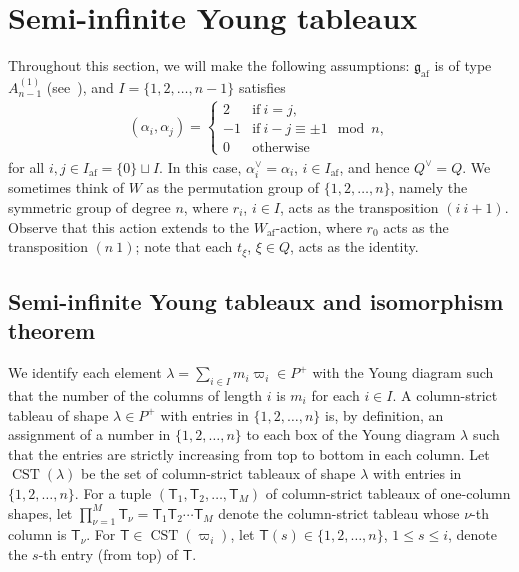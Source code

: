 \documentclass[ALCO,ThmDefs,Unicode,epreuves]{cedram}
\newcommand{\Fg}{\mathfrak{g}}
\DeclareMathOperator{\af}{af}
\DeclareMathOperator{\CST}{CST}
\begin{document}
\section{Semi-infinite Young tableaux} \label{Section:SiYT}

Throughout this section, 
we will make the following assumptions: 
$\Fg_{\af}$ 
is of type 
$A_{n-1}^{(1)}$
(see~\cite[\S~4.8 TABLE Aff1]{Kac}), 
and 
$I = \{ 1, 2, \ldots ,n-1 \}$ 
satisfies 
\begin{align}
(\alpha_i , \alpha_j)
=
\begin{cases}
2 & \text{if} \ i=j, \\
-1 & \text{if} \ i-j \equiv \pm 1 \mod n, \\
0 & \text{otherwise}
\end{cases}
\end{align}
for all $i , j \in I_{\af} = \{ 0 \} \sqcup I$. 
In this case, 
$\alpha_i^{\vee} = \alpha_i$, $i \in I_{\af}$, 
and hence 
$Q^{\vee} = Q$.
We sometimes think of $W$ as the permutation group of 
$\{ 1, 2, \ldots ,n \}$, namely the symmetric group of degree $n$, 
where $r_i$, $i \in I$, acts as the transposition $(i \ i+1)$. 
Observe that this action extends to the $W_{\af}$-action, 
where 
$r_0$ 
acts as the transposition $(n \ 1)$; 
note that each 
$t_{\xi}$, $\xi \in Q$, 
acts as the identity. 

\subsection{Semi-infinite Young tableaux and isomorphism theorem} \label{subsection:SiYT}

We identify each element $\lambda = \sum_{i \in I} m_i \varpi_i \in P^+$ 
with the Young diagram such that the number of the columns of length $i$ is $m_i$ for each $i \in I$. 
A column-strict tableau of shape 
$\lambda \in P^+$ 
with entries in 
$\{ 1,2,\ldots ,n \}$
is, by definition, an assignment of a number in 
$\{ 1,2,\ldots ,n \}$
to each box of the Young diagram 
$\lambda$
such that the entries are strictly increasing 
from top to bottom in each column.
Let $\CST (\lambda)$ 
be the set of column-strict tableaux of shape $\lambda$ 
with entries in $\{ 1,2, \ldots ,n \}$. 
For a tuple 
$(\mathsf{T}_1 , \mathsf{T}_2 , \ldots , \mathsf{T}_M)$
of column-strict tableaux of one-column shapes, let 
$\prod_{\nu = 1}^M \mathsf{T}_{\nu}
= \mathsf{T}_1 \mathsf{T}_2 \cdots \mathsf{T}_M$
denote the column-strict tableau whose $\nu$-th column is 
$\mathsf{T}_{\nu}$. 
For $\mathsf{T} \in \CST (\varpi_i)$, 
let 
$\mathsf{T}(s) \in \{ 1,2,\ldots , n \}$, $1 \leq s \leq i$, 
denote the $s$-th entry (from top) of 
$\mathsf{T}$. 
\end{document}
